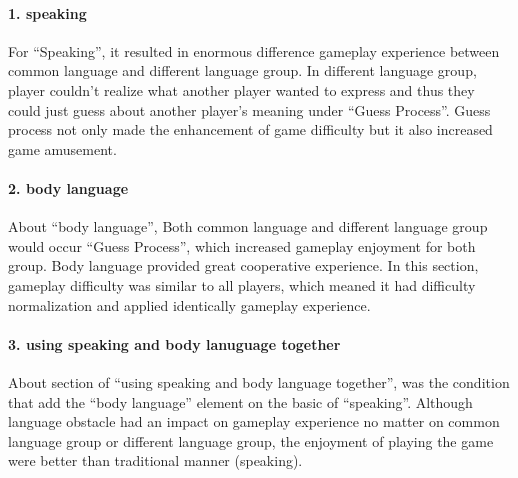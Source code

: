 \paragraph{1. speaking}
For ``Speaking'', it resulted in enormous difference gameplay experience between common language and different language group. In different language group, player couldn't realize what another player wanted to express and thus they could just guess about another player's meaning under ``Guess Process''. Guess process not only made the enhancement of game difficulty but it also increased game amusement. 

\paragraph{2. body language}
About ``body language'', Both common language and different language group would occur ``Guess Process'', which increased gameplay enjoyment for both group. Body language provided great cooperative experience.
In this section, gameplay difficulty was similar to all players, which meaned it had difficulty normalization and applied identically gameplay experience.

\paragraph{3. using speaking and body lanuguage together}
About section of ``using speaking and body language together'', was the condition that add the ``body language'' element on the basic of ``speaking''. Although language obstacle had an impact on gameplay experience no matter on common language group or different language group, the enjoyment of playing the game were better than traditional manner (speaking). 



